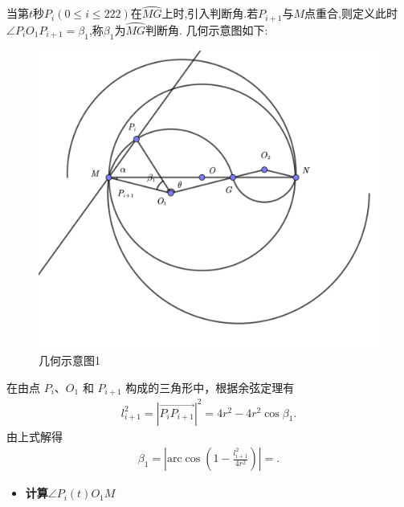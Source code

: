 \documentclass[../main.tex]{subfiles}
\begin{document}
\par 当第$t$秒$P_i(0\leq i\leq 222)$在$\wideparen{MG}$上时,引入判断角.若$P_{i+1}$与$M$点重合,则定义此时$\angle P_iO_1P_{i+1}=\beta_1$,称$\beta_1$为$\wideparen{MG}$判断角. 几何示意图如下:
\begin{figure}[H]
\centering
\includegraphics[width=.6\textwidth]{3}
\caption{几何示意图1}
\end{figure}
\par 在由点 \(P_{i}\)、\(O_{1}\) 和 \(P_{i + 1}\) 构成的三角形中，根据余弦定理有
\begin{align}
l_{i+1}^{2}=\left| \overrightarrow{P_iP_{i+1}} \right|^2=4r^2-4r^2\cos \beta _1.
\end{align}
由上式解得
\begin{align}\label{1.........443}
\beta _1=\left| \mathrm{arc}\cos \left( 1-\frac{l_{i+1}^{2}}{4r^2} \right) \right|=.
\end{align}
\begin{itemize}
\item \textbf{计算$\angle P_{i}(t)O_1M$}
\end{itemize}
\end{document}
